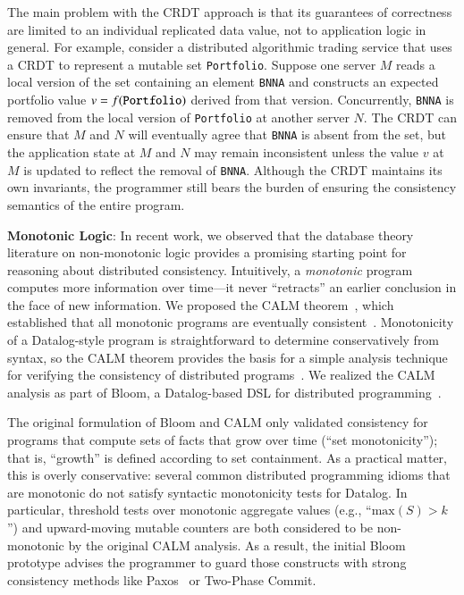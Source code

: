 The main problem with the CRDT approach is that its guarantees of correctness
are limited to an individual replicated data value, not to application logic in
general. For example, consider a distributed algorithmic trading service that
uses a CRDT to represent a mutable set \texttt{Portfolio}. Suppose one server
$M$ reads a local version of the set containing an element \texttt{BNNA} and
constructs an expected portfolio value $v = f(\mbox{\texttt{Portfolio}})$
derived from that version. Concurrently, \texttt{BNNA} is removed from the local
version of \texttt{Portfolio} at another server $N$. The CRDT can ensure that
$M$ and $N$ will eventually agree that \texttt{BNNA} is absent from the set, but
the application state at $M$ and $N$ may remain inconsistent unless the value
$v$ at $M$ is updated to reflect the removal of \texttt{BNNA}. Although the CRDT
maintains its own invariants, the programmer still bears the burden of ensuring
the consistency semantics of the entire program.

\vspace{0.5em} \noindent
\textbf{Monotonic Logic}: In recent work, we observed that the database theory
literature on non-monotonic logic provides a promising starting point for
reasoning about distributed consistency. Intuitively, a \emph{monotonic} program
computes more information over time---it never ``retracts'' an earlier
conclusion in the face of new information. We proposed the CALM
theorem~\cite{Hellerstein2010}, which established that all monotonic programs
are eventually consistent~\cite{Ameloot2011,dedalus-pods12-tr}. Monotonicity of
a Datalog-style program is straightforward to determine conservatively from
syntax, so the CALM theorem provides the basis for a simple analysis technique
for verifying the consistency of distributed programs~\cite{Alvaro2011}. We
realized the CALM analysis as part of Bloom, a Datalog-based DSL for distributed
programming~\cite{bloom}.

The original formulation of Bloom and CALM only validated consistency for programs that compute sets of facts that grow over time (``set monotonicity''); that is, ``growth'' is defined according to set containment. As a practical matter, this is overly conservative: several common distributed programming idioms that are monotonic do not satisfy syntactic monotonicity tests for Datalog. In particular, threshold tests over monotonic aggregate values (e.g., ``$\mathrm{max}(S) > k$'') and upward-moving mutable counters are both considered to be non-monotonic by the original CALM analysis.  As a result, the initial Bloom prototype advises the programmer to guard those constructs with strong consistency methods like Paxos~\cite{Lamport1998} or Two-Phase Commit. 

